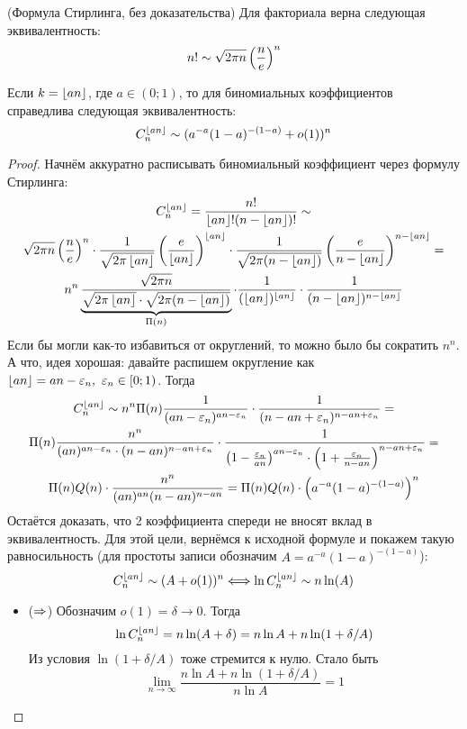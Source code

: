 \begin{theorem} (Формула Стирлинга, без доказательства)
	Для факториала верна следующая эквивалентность:
	\[
		n! \sim \sqrt{2\pi n} \left(\frac{n}{e}\right)^n
	\]
\end{theorem}

\begin{theorem}
	Если $k = \left\lfloor an \right\rfloor$, где $a \in (0; 1)$, то для биномиальных коэффициентов справедлива следующая эквивалентность:
	\[
		C_n^{\left\lfloor an \right\rfloor} \sim (a^{-a}(1 - a)^{-(1 - a)} + o(1))^n
	\]
\end{theorem}

\begin{proof}
	Начнём аккуратно расписывать биномиальный коэффициент через формулу Стирлинга:
	\begin{multline*}
		C_n^{\left\lfloor an \right\rfloor} = \frac{n!}{\left\lfloor an \right\rfloor! (n - \left\lfloor an \right\rfloor)!} \sim
		\\
		\sqrt{2\pi n} \left(\frac{n}{e}\right)^n \cdot \frac{1}{\sqrt{2\pi \left\lfloor an \right\rfloor}} \left(\frac{e}{\left\lfloor an \right\rfloor}\right)^{\left\lfloor an \right\rfloor} \cdot \frac{1}{\sqrt{2\pi (n - \left\lfloor an \right\rfloor)}} \left(\frac{e}{n - \left\lfloor an \right\rfloor}\right)^{n - \left\lfloor an \right\rfloor} =
		\\
		n^n \underbrace{\frac{\sqrt{2\pi n}}{\sqrt{2\pi \left\lfloor an \right\rfloor} \cdot \sqrt{2\pi (n - \left\lfloor an \right\rfloor)}}}_{\Pi(n)} \cdot \frac{1}{(\left\lfloor an \right\rfloor)^{\left\lfloor an \right\rfloor}} \cdot \frac{1}{(n - \left\lfloor an \right\rfloor)^{n - \left\lfloor an \right\rfloor}}
	\end{multline*}
	Если бы могли как-то избавиться от округлений, то можно было бы сократить $n^n$. А что, идея хорошая: давайте распишем округление как $\left\lfloor an \right\rfloor = an - \varepsilon_n,\ \varepsilon_n \in [0; 1)$. Тогда
	\begin{multline*}
		C_n^{\left\lfloor an \right\rfloor} \sim n^n \Pi(n) \frac{1}{(an - \varepsilon_n)^{an - \varepsilon_n}} \cdot \frac{1}{(n - an + \varepsilon_n)^{n - an + \varepsilon_n}} =
		\\
		\Pi(n) \frac{n^n}{(an)^{an - \varepsilon_n} \cdot (n - an)^{n - an + \varepsilon_n}} \cdot \frac{1}{\left(1 - \frac{\varepsilon_n}{an}\right)^{an - \varepsilon_n} \cdot \left(1 + \frac{\varepsilon_n}{n - an}\right)^{n - an + \varepsilon_n}} =
		\\
		\Pi(n) Q(n) \cdot \frac{n^n}{(an)^{an} (n - an)^{n - an}} = \Pi(n) Q(n) \cdot \left(a^{-a} (1 - a)^{-(1 - a)}\right)^n
	\end{multline*}
	Остаётся доказать, что 2 коэффициента спереди не вносят вклад в эквивалентность. Для этой цели, вернёмся к исходной формуле и покажем такую равносильность (для простоты записи обозначим $A = a^{-a}(1 - a)^{-(1 - a)}$):
	\[
		C_n^{\left\lfloor an \right\rfloor} \sim (A + o(1))^n \Longleftrightarrow \ln C_n^{\left\lfloor an \right\rfloor} \sim n\ln(A)
	\]
	\begin{itemize}
		\item ($\Rightarrow$) Обозначим $o(1) = \delta \to 0$. Тогда
		\[
			\ln C_n^{\left\lfloor an \right\rfloor} = n\ln(A + \delta) = n\ln A + n\ln(1 + \delta/A)
		\]
		Из условия $\ln(1 + \delta/A)$ тоже стремится к нулю. Стало быть
		\[
			\lim_{n \to \infty} \frac{n\ln A + n\ln(1 + \delta / A)}{n \ln A} = 1
		\]
		

\end{itemize}
\end{proof}
